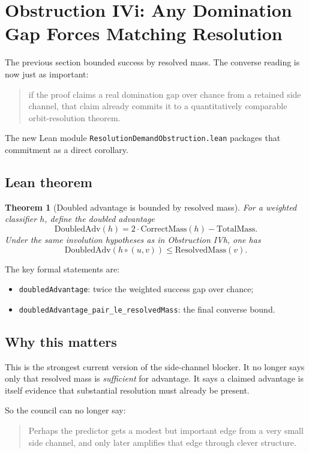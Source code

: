 \documentclass[11pt]{article}
\newtheorem{theorem}{Theorem}[section]
\theoremstyle{remark}
\begin{document}
\section{Obstruction IVi: Any Domination Gap Forces Matching Resolution}

The previous section bounded success by resolved mass.  The converse reading is now just as
important:
\begin{quote}
if the proof claims a real domination gap over chance from a retained side channel, that claim
already commits it to a quantitatively comparable orbit-resolution theorem.
\end{quote}

The new Lean module \texttt{ResolutionDemandObstruction.lean} packages that commitment as a direct
corollary.

\subsection{Lean theorem}

\begin{theorem}[Doubled advantage is bounded by resolved mass]
For a weighted classifier \(h\), define the \emph{doubled advantage}
\[
  \mathrm{DoubledAdv}(h)
  =
  2 \cdot \mathrm{CorrectMass}(h) - \mathrm{TotalMass}.
\]
Under the same involution hypotheses as in Obstruction IVh, one has
\[
  \mathrm{DoubledAdv}(h \circ (u,v))
  \le
  \mathrm{ResolvedMass}(v).
\]
\end{theorem}

\noindent
The key formal statements are:
\begin{itemize}[leftmargin=1.5em]
  \item \texttt{doubledAdvantage}: twice the weighted success gap over chance;
  \item \texttt{doubledAdvantage\_pair\_le\_resolvedMass}: the final converse bound.
\end{itemize}

\subsection{Why this matters}

This is the strongest current version of the side-channel blocker.  It no longer says only that
resolved mass is \emph{sufficient} for advantage.  It says a claimed advantage is itself evidence
that substantial resolution must already be present.

So the council can no longer say:
\begin{quote}
Perhaps the predictor gets a modest but important edge from a very small side channel, and only
later amplifies that edge through clever structure.
\end{quote}
\end{document}
